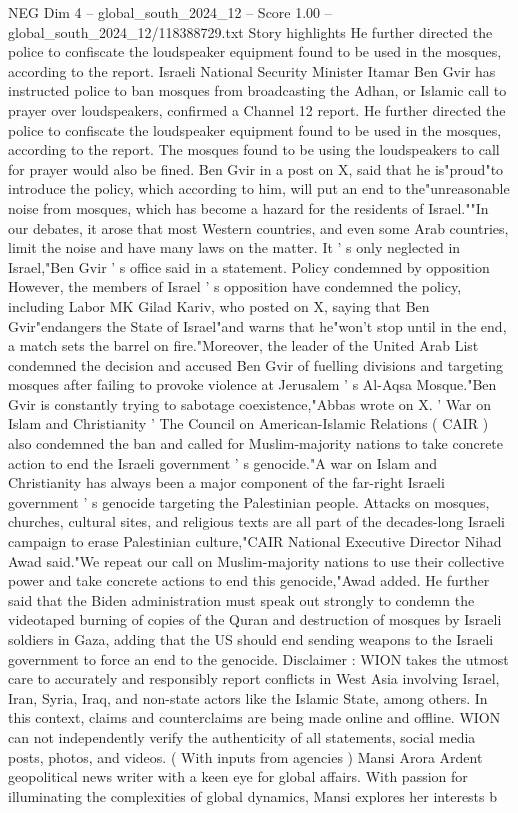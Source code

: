 \begin{textsample}{NEG Dim 4 – global\_south\_2024\_12 – Score 1.00 – global\_south\_2024\_12/118388729.txt}  \label{ex:f4_neg_224}
Story highlights He further directed the police to confiscate the loudspeaker equipment found to be used in the mosques, according to the report.
Israeli National Security Minister Itamar Ben Gvir has instructed police to ban mosques from broadcasting the Adhan, or Islamic call to prayer over loudspeakers, confirmed a Channel 12 report.
He further directed the police to confiscate the loudspeaker equipment found to be used in the mosques, according to the report.
The mosques found to be using the loudspeakers to call for prayer would also be fined.
Ben Gvir in a post on X, said that he is"proud"to introduce the policy, which according to him, will put an end to the"unreasonable noise from mosques, which has become a hazard for the residents of Israel.""In our debates, it arose that most Western countries, and even some Arab countries, limit the noise and have many laws on the matter.
It ' s only neglected in Israel,"Ben Gvir ' s office said in a statement.
Policy condemned by opposition However, the members of Israel ' s opposition have condemned the policy, including Labor MK Gilad Kariv, who posted on X, saying that Ben Gvir"endangers the State of Israel"and warns that he"won't stop until in the end, a match sets the barrel on fire."Moreover, the leader of the United Arab List condemned the decision and accused Ben Gvir of fuelling divisions and targeting mosques after failing to provoke violence at Jerusalem ' s Al-Aqsa Mosque."Ben Gvir is constantly trying to sabotage coexistence,"Abbas wrote on X. ' War on Islam and Christianity ' The Council on American-Islamic Relations ( CAIR ) also condemned the ban and called for Muslim-majority nations to take concrete action to end the Israeli government ' s genocide."A war on Islam and Christianity has always been a major component of the far-right Israeli government ' s genocide targeting the Palestinian people.
Attacks on mosques, churches, cultural sites, and religious texts are all part of the decades-long Israeli campaign to erase Palestinian culture,"CAIR National Executive Director Nihad Awad said."We repeat our call on Muslim-majority nations to use their collective power and take concrete actions to end this genocide,"Awad added.
He further said that the Biden administration must speak out strongly to condemn the videotaped burning of copies of the Quran and destruction of mosques by Israeli soldiers in Gaza, adding that the US should end sending weapons to the Israeli government to force an end to the genocide.
Disclaimer : WION takes the utmost care to accurately and responsibly report conflicts in West Asia involving Israel, Iran, Syria, Iraq, and non-state actors like the Islamic State, among others.
In this context, claims and counterclaims are being made online and offline.
WION can not independently verify the authenticity of all statements, social media posts, photos, and videos. ( With inputs from agencies ) Mansi Arora Ardent geopolitical news writer with a keen eye for global affairs.
With passion for illuminating the complexities of global dynamics, Mansi explores her interests b

\end{textsample}
